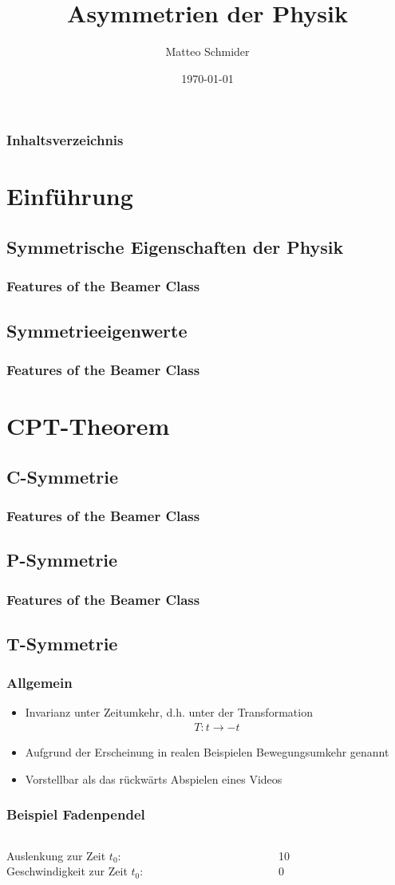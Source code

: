 \documentclass{beamer}
\title{Asymmetrien der Physik}
\author{Matteo Schmider}
\date{\today}
\begin{document}
\frame{\titlepage}

\begin{frame}
\frametitle{Inhaltsverzeichnis}\tableofcontents
\end{frame}

\section{Einführung}
\subsection{Symmetrische Eigenschaften der Physik}
\frame
{
  \frametitle{Features of the Beamer Class}

}
\subsection{Symmetrieeigenwerte}
\frame
{
  \frametitle{Features of the Beamer Class}

}
\section{CPT-Theorem}
\subsection{C-Symmetrie}
\frame
{
  \frametitle{Features of the Beamer Class}

}
\subsection{P-Symmetrie}
\frame
{
  \frametitle{Features of the Beamer Class}

}
\subsection{T-Symmetrie}
\frame
{
  \frametitle{Allgemein}
  \begin{itemize}
    \item Invarianz unter Zeitumkehr, d.h. unter der Transformation
      \begin{align}
        T: t \to -t
      \end{align}
      \pause
    \item Aufgrund der Erscheinung in realen Beispielen Bewegungsumkehr genannt
    \item Vorstellbar als das rückwärts Abspielen eines Videos
  \end{itemize}
}
\frame
{
  \frametitle{Beispiel Fadenpendel}
  \begin{columns}
    \begin{column}{0.5\textwidth}
      Auslenkung zur Zeit $t_{0}$:\\
      Geschwindigkeit zur Zeit $t_{0}$:
    \end{column}
    \begin{column}{0.5\textwidth}  %
      10\degree\\
      0
    \end{column}
  \end{columns}
}
\end{document}
